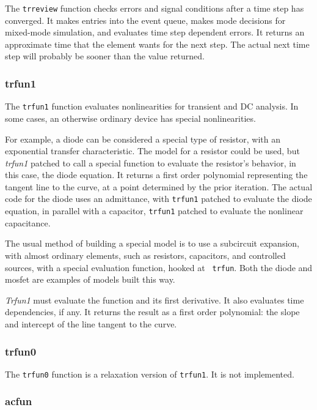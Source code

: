 The {\tt trreview} function checks errors and signal conditions after a time
step has converged.  It makes entries into the event queue, makes mode
decisions for mixed-mode simulation, and evaluates time step dependent
errors.  It returns an approximate time that the element wants for the next
step.  The actual next time step will probably be sooner than the value
returned.
\subsubsection{trfun1}

The {\tt trfun1} function evaluates nonlinearities for transient and DC
analysis.  In some cases, an otherwise ordinary device has special
nonlinearities.

For example, a diode can be considered a special type of resistor, with an
exponential transfer characteristic.  The model for a resistor could be
used, but {\em trfun1} patched to call a special function to evaluate the
resistor's behavior, in this case, the diode equation.  It returns a first
order polynomial representing the tangent line to the curve, at a point
determined by the prior iteration.  The actual code for the diode uses an
admittance, with {\tt trfun1} patched to evaluate the diode equation, in
parallel with a capacitor, {\tt trfun1} patched to evaluate the nonlinear
capacitance.

The usual method of building a special model is to use a subcircuit
expansion, with almost ordinary elements, such as resistors, capacitors, and
controlled sources, with a special evaluation function, hooked at {\tt
trfun}.  Both the diode and mosfet are examples of models built this way.

{\em Trfun1} must evaluate the function and its first derivative.  It also
evaluates time dependencies, if any.  It returns the result as a first order
polynomial: the slope and intercept of the line tangent to the curve.
\subsubsection{trfun0}

The {\tt trfun0} function is a relaxation version of {\tt trfun1}.  It is
not implemented.
\subsubsection{acfun}

